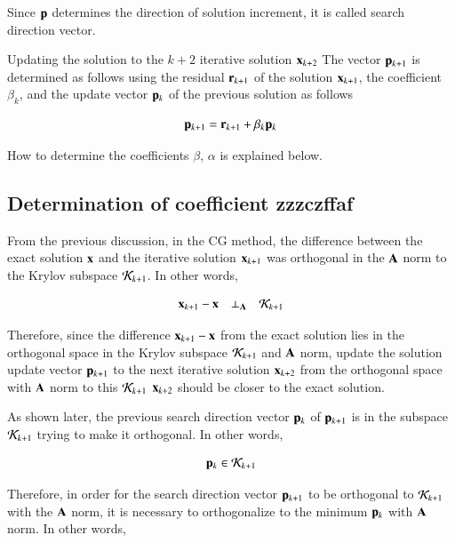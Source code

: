 Since $\mathbf{p}$ determines the direction of solution increment, it is called search direction vector.

Updating the solution to the $k+2$ iterative solution $\mathbf{x}_{k+2}$ The vector $\mathbf{p}_{k+1}$ is determined as follows using the residual $\mathbf{r}_{k+1}$ of the solution $\mathbf{x}_{k+1}$, the coefficient $\beta_k$, and the update vector $\mathbf{p}_k$ of the previous solution as follows


\begin{equation}
\mathbf{p}_{k+1}=\mathbf{r}_{k+1}+\beta_k\mathbf{p}_k
\end{equation}


How to determine the coefficients $\beta$, $\alpha$ is explained below.



\subsection{Determination of coefficient zzzczffaf}


From the previous discussion, in the CG method, the difference between the exact solution $\mathbf{x}$ and the iterative solution $\mathbf{x}_{k+1}$ was orthogonal in the $\mathbf{A}$ norm to the Krylov subspace ${\cal K}_{k+1}$. In other words,

\begin{equation}
\mathbf{x}_{k+1}-\mathbf{x}\quad\bot_{\mathbf{A}}\quad{\cal K}_{k+1}
\end{equation}


Therefore, since the difference $\mathbf{x}_{k+1}-\mathbf{x}$ from the exact solution lies in the orthogonal space in the Krylov subspace ${\cal K}_{k+1}$ and $\mathbf{A}$ norm, update the solution update vector $\mathbf{p}_{k+1}$ to the next iterative solution $\mathbf{x}_{k+2}$ from the orthogonal space with $\mathbf{A}$ norm to this ${\cal K}_{k+1}$ $\mathbf{x}_{k+2}$ should be closer to the exact solution.

As shown later, the previous search direction vector $\mathbf{p}_k$ of $\mathbf{p}_{k+1}$ is in the subspace ${\cal K}_{k+1}$ trying to make it orthogonal. In other words,

\begin{equation}
\mathbf{p}_k\in{\cal K}_{k+1}
\end{equation}


Therefore, in order for the search direction vector $\mathbf{p}_{k+1}$ to be orthogonal to ${\cal K}_{k+1}$ with the $\mathbf{A}$ norm, it is necessary to orthogonalize to the minimum $\mathbf{p}_k$ with $\mathbf{A}$ norm. In other words,

